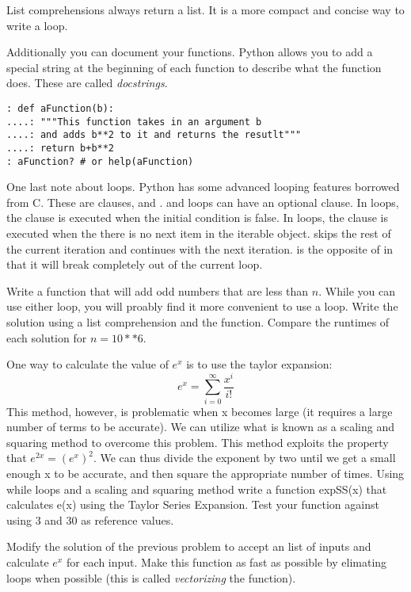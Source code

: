 List comprehensions always return a list.  It is a more compact and concise  way to write a  loop.

Additionally you can document your functions. Python allows you to add a special string at the beginning of each function to describe what the function does.  These are called \emph{docstrings}.
\begin{lstlisting}[style=python]
: def aFunction(b):
....: """This function takes in an argument b
....: and adds b**2 to it and returns the resutlt"""
....: return b+b**2
: aFunction? # or help(aFunction)
\end{lstlisting}

One last note about loops.  Python has some advanced looping features borrowed from C.  These are  clauses,  and .   and  loops can have an optional  clause.  In  loops, the  clause is executed when the initial condition is false.  In  loops, the  clause is executed when the there is no next item in the iterable object.   skips the rest of the current iteration and continues with the next iteration.   is the opposite of  in that it will break completely out of the current loop.

\begin{problem}
Write a function that will add odd numbers that are less than $n$. While you can use either loop, you will proably find it more convenient to use a  loop. Write the solution using a list comprehension and the  function. Compare the runtimes of each solution for $n=10**6$.
\end{problem}



\begin{problem}
One way to calculate the value of $e^x$ is to use the taylor expansion:
\[
e^x = \sum_{i=0}^\infty{\frac{x^i}{i!}}
\]
This method, however, is problematic when x becomes large (it requires a large number of terms to be accurate). We can utilize what is known as a scaling and squaring method to overcome this problem. This method exploits the property that $e^{2x} = (e^x)^2$. We can thus divide the exponent by two until we get a small enough x to be accurate, and then square the appropriate number of times.
Using while loops and a scaling and squaring method write a function expSS(x) that calculates e(x) using the Taylor Series Expansion. Test your function against  using $3$ and $30$ as reference values.
\end{problem}

\begin{problem}
Modify the solution of the previous problem to accept an list of inputs and calculate $e^x$ for each input. Make this function as fast as possible by elimating loops when possible (this is called \emph{vectorizing} the function).
\end{problem}